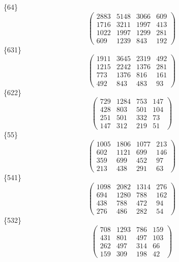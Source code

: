 \documentclass[12pt,reqno]{amsart}
\begin{document}
\{64\}                             $$ \begin{pmatrix} 
                     2883 & 5148 & 3066 & 609 \\[6pt]
                     1716 & 3211 & 1997 & 413 \\[6pt]
                     1022 & 1997 & 1299 & 281 \\[6pt]
                        609 & 1239 & 843 & 192
                              \end{pmatrix} $$ 
\{631\}                             $$ \begin{pmatrix} 
                     1911 & 3645 & 2319 & 492 \\[6pt]
                     1215 & 2242 & 1376 & 281 \\[6pt]
                      773 & 1376 & 816 & 161 \\[6pt]
                         492 & 843 & 483 & 93
                              \end{pmatrix} $$ 
\{622\}                             $$ \begin{pmatrix} 
                      729 & 1284 & 753 & 147 \\[6pt]
                       428 & 803 & 501 & 104 \\[6pt]
                       251 & 501 & 332 & 73 \\[6pt]
                         147 & 312 & 219 & 51
                              \end{pmatrix} $$ 
\{55\}                             $$ \begin{pmatrix} 
                     1005 & 1806 & 1077 & 213 \\[6pt]
                      602 & 1121 & 699 & 146 \\[6pt]
                       359 & 699 & 452 & 97 \\[6pt]
                         213 & 438 & 291 & 63
                              \end{pmatrix} $$ 
\{541\}                             $$ \begin{pmatrix} 
                     1098 & 2082 & 1314 & 276 \\[6pt]
                      694 & 1280 & 788 & 162 \\[6pt]
                       438 & 788 & 472 & 94 \\[6pt]
                         276 & 486 & 282 & 54
                              \end{pmatrix} $$ 
\{532\}                             $$ \begin{pmatrix} 
                      708 & 1293 & 786 & 159 \\[6pt]
                       431 & 801 & 497 & 103 \\[6pt]
                       262 & 497 & 314 & 66 \\[6pt]
                         159 & 309 & 198 & 42
                              \end{pmatrix} $$ 
\end{document}
